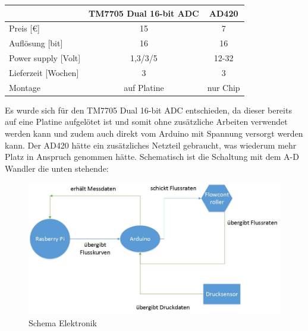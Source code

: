 \begin{center}
\begin{tabular}{l|c|c}
	& TM7705 Dual 16-bit ADC & AD420 \\ 
	\hline Preis [\euro]	& 15  & 7 \\ 
	\hline Auflösung [bit]	& 16  & 16 \\ 
	\hline Power supply [Volt]	& 1,3/3/5  & 12-32 \\ 
	\hline Lieferzeit [Wochen]	& 3  & 3 \\ 
	\hline Montage 	& auf Platine  & nur Chip \\ 
\end{tabular} 	
\end{center}


Es wurde sich für den TM7705 Dual 16-bit ADC entschieden, da dieser bereits auf eine Platine aufgelötet ist und somit ohne zusätzliche Arbeiten verwendet werden kann und zudem auch direkt vom Arduino mit Spannung versorgt werden kann. Der AD420 hätte ein zusätzliches Netzteil gebraucht, was wiederum mehr Platz in Anspruch genommen hätte. Schematisch ist die Schaltung mit dem A-D Wandler die unten stehende:


\begin{figure}[h]
	\begin{center}
		\includegraphics[scale=0.6]{Schema_Elektronik.jpg}
		\caption{Schema Elektronik}
	\end{center}
\end{figure}


